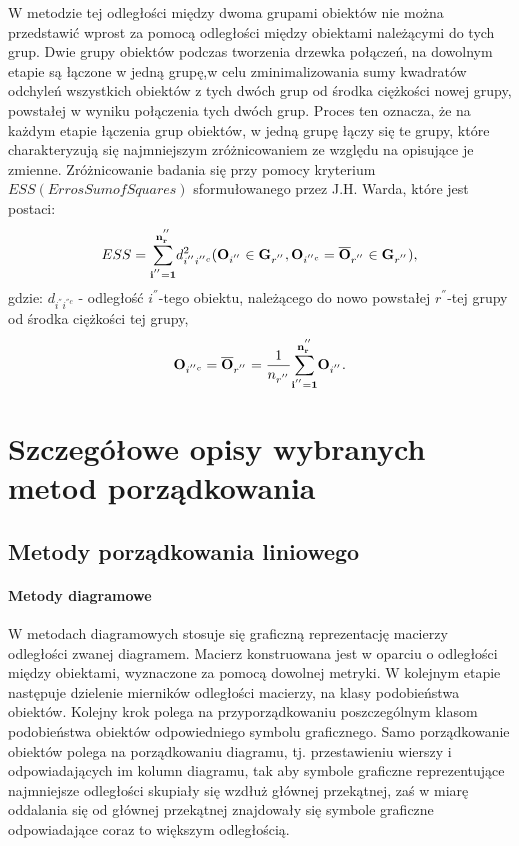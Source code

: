 \documentclass[12pt,a4paper]{report}
\begin{document}
W metodzie tej odległości między dwoma grupami obiektów nie można przedstawić wprost za pomocą odległości między obiektami należącymi do tych grup. Dwie grupy obiektów podczas tworzenia drzewka połączeń, na dowolnym etapie są łączone w jedną grupę,w celu zminimalizowania sumy kwadratów odchyleń wszystkich obiektów z tych dwóch grup od środka ciężkości nowej grupy, powstałej w wyniku połączenia tych dwóch grup. Proces ten oznacza, że na każdym etapie łączenia grup obiektów, w jedną grupę łączy się te grupy, które charakteryzują się najmniejszym zróżnicowaniem ze względu na opisujące je zmienne. Zróżnicowanie badania się przy pomocy kryterium $ESS (Erros Sum of Squares)$ sformułowanego przez J.H. Warda, które jest postaci:
\begin{equation}
ESS= \bold{\sum_{i^{''}=1}^{n_r^{''}}} d_{i^{''}i^{''c}}^2 ( \bold{O}_{i^{''}} \in \bold{G}_{r^{''}}, \bold{O}_{i^{''c}}=\bold{\overline{O}}_{r^{''}} \in \bold{G}_{r^{''}} ),
\end{equation} 
gdzie:
$d_{i^{''}i^{''c}}$ - odległość $i^{''}$-tego obiektu, należącego do nowo powstałej $r^{''}$-tej grupy od środka ciężkości tej grupy,\\
\begin{equation}
\bold{O}_{i^{''c}} = \bold{\overline{O}}_{r^{''}}=\frac{1}{n_{r^{''}}} \bold{\sum_{i^{''}=1}^{n_r^{''}}} \bold{O}_{i^{''}}.
\end{equation}

\newpage
\chapter{Szczegółowe opisy wybranych metod porządkowania}
\section{Metody porządkowania liniowego}
\subsubsection{Metody diagramowe}
\noindent

W metodach diagramowych stosuje się graficzną reprezentację macierzy odległości zwanej diagramem. Macierz konstruowana jest w oparciu o odległości między obiektami, wyznaczone za pomocą dowolnej metryki. W kolejnym etapie następuje dzielenie mierników odległości macierzy, na klasy podobieństwa obiektów. Kolejny krok polega na przyporządkowaniu poszczególnym klasom podobieństwa obiektów odpowiedniego symbolu graficznego. Samo porządkowanie obiektów polega na porządkowaniu diagramu, tj. przestawieniu wierszy i odpowiadających im kolumn diagramu, tak aby symbole graficzne reprezentujące najmniejsze odległości skupiały się wzdłuż głównej przekątnej, zaś w miarę oddalania się od głównej przekątnej znajdowały się symbole graficzne odpowiadające coraz to większym odległością. 
\end{document}
